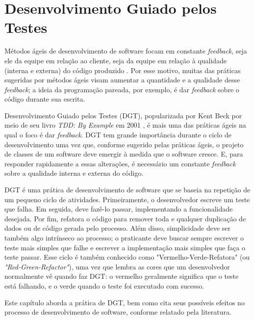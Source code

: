 \chapter{Desenvolvimento Guiado pelos Testes}
\label{cap:tdd}

Métodos ágeis de desenvolvimento de software focam em constante
\textit{feedback}, seja ele da equipe em relação ao cliente, seja da equipe em relação à
qualidade (interna e externa) do código produzido \cite{AgileManifesto}. Por
esse motivo, muitas das práticas sugeridas por métodos ágeis visam aumentar a 
quantidade e a qualidade desse \textit{feedback}; a ideia da programação pareada, por
exemplo, é dar \textit{feedback} sobre o código durante sua escrita.

Desenvolvimento Guiado pelos Testes (DGT), popularizada por Kent Beck por meio de seu livro
\textit{TDD: By Example} em 2001 \cite{TDDByExample}, é mais uma das práticas
ágeis na qual o foco é dar \textit{feedback}. DGT tem grande importância durante o ciclo
de desenvolvimento uma vez que, conforme sugerido pelas práticas ágeis, o projeto de classes de um
software deve emergir à medida que o software cresce. E, para responder
rapidamente a essas alterações, é necessário um constante \textit{feedback} sobre a
qualidade interna e externa do código.

DGT é uma prática de desenvolvimento de software que se baseia na repetição de
um pequeno ciclo de atividades. Primeiramente, o desenvolvedor escreve um
teste que falha. Em seguida, deve fazê-lo passar, implementando a
funcionalidade desejada. Por fim, refatora o código para remover toda e qualquer
duplicação de dados ou de código gerada pelo processo.
Além disso, simplicidade deve ser também algo intrínseco ao processo; o praticante
deve buscar sempre escrever o teste mais simples que falhe e escrever a implementação mais simples
que faça o teste passar.
Esse ciclo
é também conhecido como 
"Vermelho-Verde-Refatora" (ou \textit{"Red-Green-Refactor"}), uma vez que lembra as cores que um 
desenvolvedor normalmente vê quando faz DGT: o vermelho geralmente significa que
o teste está falhando, e o verde quando o teste foi executado com sucesso.

Este capítulo aborda a prática de DGT, bem como cita
seus possíveis efeitos no processo de desenvolvimento de software, conforme relatado pela
literatura.

